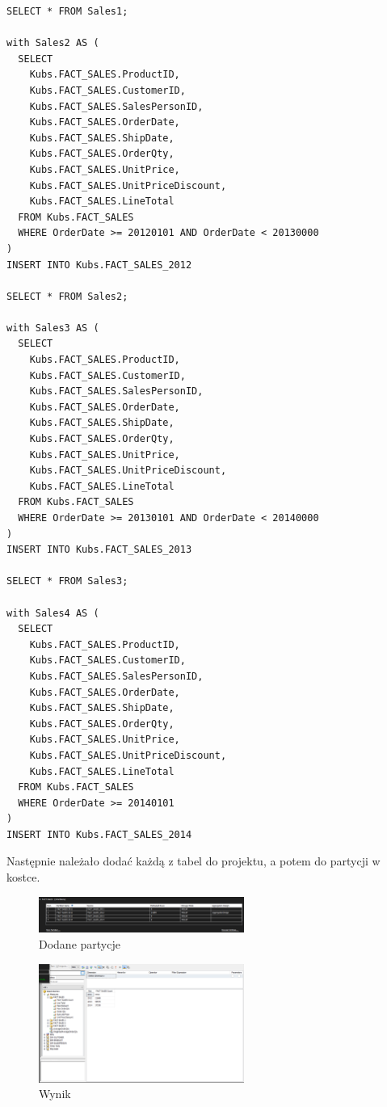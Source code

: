 \documentclass[a4paper,12pt]{article}
\begin{document}
\begin{lstlisting}[caption={Tworzenie i wypełnianie tabeli DIM\_TIME.}, label=lst:zad2_dim_time]
SELECT * FROM Sales1;

with Sales2 AS (
  SELECT 
    Kubs.FACT_SALES.ProductID,
    Kubs.FACT_SALES.CustomerID,
    Kubs.FACT_SALES.SalesPersonID,
    Kubs.FACT_SALES.OrderDate,
    Kubs.FACT_SALES.ShipDate,
    Kubs.FACT_SALES.OrderQty,
    Kubs.FACT_SALES.UnitPrice,
    Kubs.FACT_SALES.UnitPriceDiscount,
    Kubs.FACT_SALES.LineTotal
  FROM Kubs.FACT_SALES
  WHERE OrderDate >= 20120101 AND OrderDate < 20130000
)
INSERT INTO Kubs.FACT_SALES_2012

SELECT * FROM Sales2;

with Sales3 AS (
  SELECT 
    Kubs.FACT_SALES.ProductID,
    Kubs.FACT_SALES.CustomerID,
    Kubs.FACT_SALES.SalesPersonID,
    Kubs.FACT_SALES.OrderDate,
    Kubs.FACT_SALES.ShipDate,
    Kubs.FACT_SALES.OrderQty,
    Kubs.FACT_SALES.UnitPrice,
    Kubs.FACT_SALES.UnitPriceDiscount,
    Kubs.FACT_SALES.LineTotal
  FROM Kubs.FACT_SALES
  WHERE OrderDate >= 20130101 AND OrderDate < 20140000
)
INSERT INTO Kubs.FACT_SALES_2013

SELECT * FROM Sales3;

with Sales4 AS (
  SELECT 
    Kubs.FACT_SALES.ProductID,
    Kubs.FACT_SALES.CustomerID,
    Kubs.FACT_SALES.SalesPersonID,
    Kubs.FACT_SALES.OrderDate,
    Kubs.FACT_SALES.ShipDate,
    Kubs.FACT_SALES.OrderQty,
    Kubs.FACT_SALES.UnitPrice,
    Kubs.FACT_SALES.UnitPriceDiscount,
    Kubs.FACT_SALES.LineTotal
  FROM Kubs.FACT_SALES
  WHERE OrderDate >= 20140101
)
INSERT INTO Kubs.FACT_SALES_2014
\end{lstlisting}

Następnie należało dodać każdą z tabel do projektu, a potem do partycji w kostce.

\begin{figure}[H]
  \includegraphics[width=0.6\textwidth]{images/4a.png}
  \caption{Dodane partycje}
\end{figure}

\begin{figure}[H]
  \includegraphics[width=0.6\textwidth]{images/4a_result.png}
  \caption{Wynik}
\end{figure}
\end{document}
